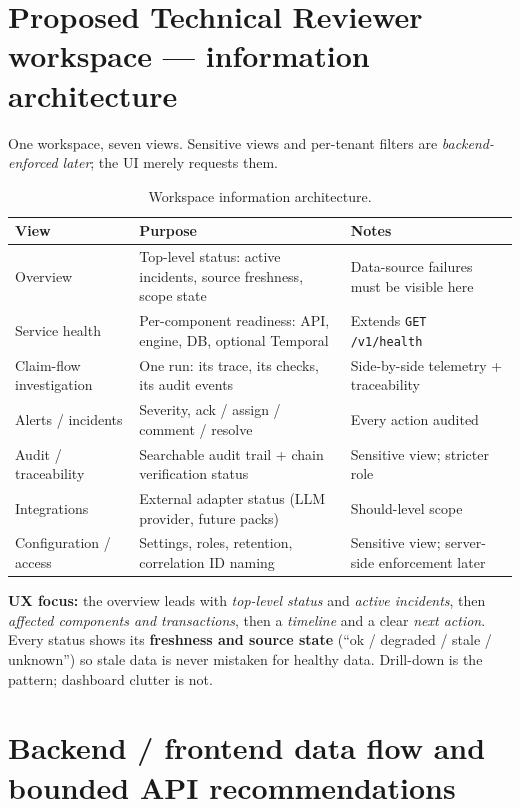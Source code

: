 \documentclass[11pt]{article}
\newcommand{\code}[1]{\texttt{#1}}
\begin{document}
\section{Proposed Technical Reviewer workspace --- information architecture}

One workspace, seven views. Sensitive views and per-tenant filters are
\emph{backend-enforced later}; the UI merely requests them.

\begin{table}[h]
\centering
\small
\begin{tabularx}{\textwidth}{@{} L L L @{}}
\toprule
\textbf{View} & \textbf{Purpose} & \textbf{Notes} \\
\midrule
Overview & Top-level status: active incidents, source freshness, scope state &
Data-source failures must be visible here \\
Service health & Per-component readiness: API, engine, DB, optional Temporal &
Extends \code{GET /v1/health} \\
Claim-flow investigation & One run: its trace, its checks, its audit events &
Side-by-side telemetry + traceability \\
Alerts / incidents & Severity, ack / assign / comment / resolve &
Every action audited \\
Audit / traceability & Searchable audit trail + chain verification status &
Sensitive view; stricter role \\
Integrations & External adapter status (LLM provider, future packs) &
Should-level scope \\
Configuration / access & Settings, roles, retention, correlation ID naming &
Sensitive view; server-side enforcement later \\
\bottomrule
\end{tabularx}
\caption{Workspace information architecture.}
\label{tab:ia}
\end{table}

\textbf{UX focus:} the overview leads with \emph{top-level status} and
\emph{active incidents}, then \emph{affected components and transactions},
then a \emph{timeline} and a clear \emph{next action}. Every status shows its
\textbf{freshness and source state} (``ok / degraded / stale / unknown'') so
stale data is never mistaken for healthy data. Drill-down is the pattern;
dashboard clutter is not.

\section{Backend / frontend data flow and bounded API recommendations}
\end{document}
